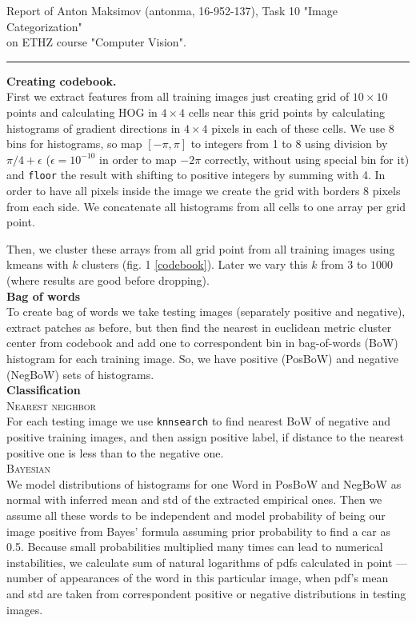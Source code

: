 \documentclass{report}
\begin{document}
\large
Report of Anton Maksimov (antonma, 16-952-137), Task 10 "Image Categorization"\\
 on ETHZ course "Computer Vision".\\
\rule{\linewidth}{1pt}
	\textbf{Creating codebook.}\\
	 First we extract features from all training images just creating grid of $10\times10$ points and calculating HOG in $4\times4$ cells near this grid points by calculating histograms of gradient directions in $4\times4$ pixels in each of these cells. We use 8 bins for histograms, so map $[-\pi,\pi]$ to integers from 1 to 8 using division by $\pi/4+\epsilon$ ($\epsilon=10^{-10}$ in order to map $-2\pi$ correctly, without using special bin for it) and \texttt{floor} the result with shifting to positive integers by summing with 4. In order to have all pixels inside the image we create the grid with borders 8 pixels from each side. We concatenate all histograms from all cells to one array per grid point.
	 
	 Then, we cluster these arrays from all grid point from all training images using kmeans with $k$ clusters (fig. 1 \ref{codebook}). Later we vary this $k$ from $3$ to $1000$ (where results are good before dropping).\\
	 
	 \textbf{Bag of words}\\
	 To create bag of words we take testing images (separately positive and negative), extract patches as before, but then find the nearest in euclidean metric cluster center from codebook and add one to correspondent bin in bag-of-words (BoW) histogram for each training image. So, we have positive (PosBoW) and negative (NegBoW) sets of histograms.\\
	  
	 \textbf{Classification}\\
	 \textsc{Nearest neighbor}\\
	 For each testing image we use \texttt{knnsearch} to find nearest BoW of negative and positive training images, and then assign positive label, if distance to the nearest positive one is less than to the negative one.
	 \\
	 
	 \textsc{Bayesian}\\
	 We model distributions of histograms for one Word in PosBoW and NegBoW as normal with inferred mean and std of the extracted empirical ones. Then we assume all these words to be independent and model probability of being our image positive from Bayes' formula assuming prior probability to find a car as 0.5. Because small probabilities multiplied many times can lead to numerical instabilities, we calculate sum of natural logarithms of pdfs calculated in point --- number of appearances of the word in this particular image, when pdf's mean and std are taken from correspondent positive or negative distributions in testing images.
	 
\end{document}
